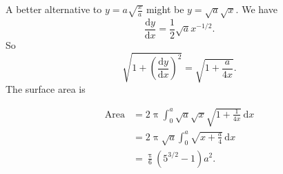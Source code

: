 \documentclass[12pt,fleqn,answers]{exam}
\begin{document}
A better alternative to $y = a \sqrt{\frac{x}{a}}$
might be $y = \sqrt{a} \sqrt{x}$. We have
\begin{equation}
  \frac{\mathrm{d} y}{\mathrm{d} x} = \frac{1}{2} \sqrt{a} x^{-1/2}.
\end{equation}
So 
\begin{equation}
  \sqrt{1 + \left(\frac{\mathrm{d} y}{\mathrm{d} x}\right)^2}
     = \sqrt{1 + \frac{a}{4 x}}.
\end{equation}
The surface area is 

\begin{align*}
  \text{Area} &= 2 \uppi \int_0^a  \sqrt{a} \sqrt{x} 
  \sqrt{1 + \frac{1}{4 x}} \, \mathrm{d} x \\
  &= 2 \uppi \sqrt{a} \int_0^a \sqrt{x + \frac{a}{4}} \, \mathrm{d} x \\
  &= \frac{\uppi}{6} \left(5^{3/2} - 1 \right) a^2.
\end{align*}

  
\end{document}
